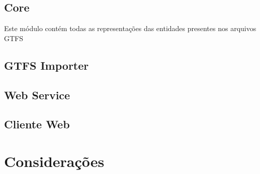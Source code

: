 \subsection{Core}
Este módulo contém todas as representações das entidades presentes nos arquivos GTFS

\subsection{GTFS Importer}

\subsection{Web Service}

\subsection{Cliente Web}

\section{Considerações}

